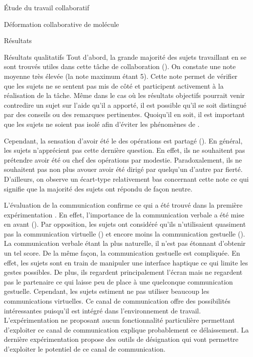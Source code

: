 \documentclass[myfrancais]{mythesis}
\begin{document}
\begin{mypart}{Étude du travail collaboratif}
\begin{mychapter}{Déformation collaborative de molécule}
\begin{mysection}{Résultats}
\begin{mysubsection}{Résultats qualitatifs}
					Tout d'abord, la grande majorité des sujets travaillant en  se sont trouvés utiles dans cette tâche de collaboration ().
					On constate une note moyenne très élevée (la note maximum étant 5).
					Cette note permet de vérifier que les sujets ne se sentent pas mis de côté et participent activement à la réalisation de la tâche.
					Même dans le cas où les résultats objectifs pourrait venir contredire un sujet sur l'aide qu'il a apporté, il est possible qu'il se soit distingué par des conseils ou des remarques pertinentes.
					Quoiqu'il en soit, il est important que les sujets ne soient pas isolé afin d'éviter les phénomènes de .

					Cependant, la sensation d'avoir été le  des opérations est partagé ().
					En général, les sujets n'apprécient pas cette dernière question.
					En effet, ils ne souhaitent pas prétendre avoir été  ou chef des opérations par modestie.
					Paradoxalement, ils ne souhaitent pas non plus avouer avoir été dirigé par quelqu'un d'autre par fierté.
					D'ailleurs, on observe un écart-type relativement bas concernant cette note ce qui signifie que la majorité des sujets ont répondu de façon neutre.

					L'évaluation de la communication confirme ce qui a été trouvé dans la première expérimentation .
					En effet, l'importance de la communication verbale a été mise en avant ().
					Par opposition, les sujets ont considéré qu'ils n'utilisaient quasiment pas la communication virtuelle () et encore moins la communication gestuelle ().
					La communication verbale étant la plus naturelle, il n'est pas étonnant d'obtenir un tel score.
					De la même façon, la communication gestuelle est compliquée.
					En effet, les sujets sont en train de manipuler une interface haptique ce qui limite les gestes possibles.
					De plus, ils regardent principalement l'écran mais ne regardent pas le partenaire ce qui laisse peu de place à une quelconque communication gestuelle.
					Cependant, les sujets estiment ne pas utiliser beaucoup les communications virtuelles.
					Ce canal de communication offre des possibilités intéressantes puisqu'il est intégré dans l'environnement de travail.
					L'expérimentation ne proposant aucun fonctionnalité particulière permettant d'exploiter ce canal de communication explique probablement ce délaissement.
					La dernière expérimentation  propose des outils de désignation qui vont permettre d'exploiter le potentiel de ce canal de communication.


\end{mysubsection}
\end{mysection}
\end{mychapter}
\end{mypart}
\end{document}
